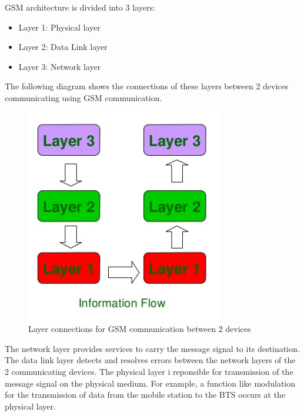 GSM architecture is divided into 3 layers:
\begin{itemize}
	\item Layer 1: Physical layer
	\item Layer 2: Data Link layer
	\item Layer 3: Network layer
\end{itemize}

The following diagram shows the connections of these layers between 2 devices communicating using GSM communication.
\begin{figure}[h]
	\centering
	\includegraphics[scale=0.6]{24.png}
	\caption{Layer connections for GSM communication between 2 devices}
\end{figure} 

The network layer provides services to carry the message signal to its destination. The data link layer detects and resolves errors between the network layers of the 2 communicating devices. The physical layer i reponsible for transmission of the message signal on the physical medium. For example, a function like modulation for the transmission of data from the mobile station to the BTS occurs at the physical layer.

